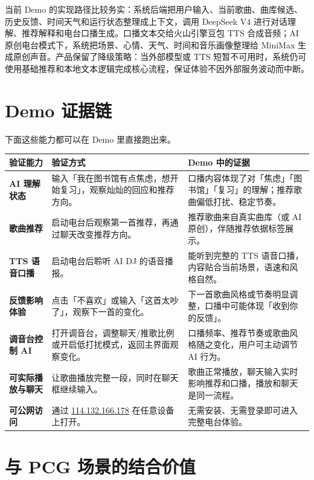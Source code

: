 \documentclass[UTF8,a4paper,11pt,fontset=windows]{ctexart}
\begin{document}
当前 Demo 的实现路径比较务实：系统后端把用户输入、当前歌曲、曲库候选、历史反馈、时间天气和运行状态整理成上下文，调用 DeepSeek V4 进行对话理解、推荐解释和电台口播生成。口播文本交给火山引擎豆包 TTS 合成音频；AI 原创电台模式下，系统把场景、心情、天气、时间和音乐画像整理给 MiniMax 生成原创声音。产品保留了降级策略：当外部模型或 TTS 短暂不可用时，系统仍可使用基础推荐和本地文本逻辑完成核心流程，保证体验不因外部服务波动而中断。

\section{Demo 证据链}

下面这些能力都可以在 Demo 里直接跑出来。

\begin{longtable}{>{\bfseries}p{2.8cm}p{5.2cm}p{6.6cm}}
\toprule
验证能力 & 验证方式 & Demo 中的证据 \\
\midrule
AI 理解状态 & 输入「我在图书馆有点焦虑，想开始复习」，观察灿灿的回应和推荐方向。 & 口播内容体现了对「焦虑」「图书馆」「复习」的理解；推荐歌曲偏低打扰、稳定节奏。 \\
歌曲推荐 & 启动电台后观察第一首推荐，再通过聊天改变推荐方向。 & 推荐歌曲来自真实曲库（或 AI 原创），伴随推荐依据标签展示。 \\
TTS 语音口播 & 启动电台后聆听 AI DJ 的语音播报。 & 能听到完整的 TTS 语音口播，内容贴合当前场景，语速和风格自然。 \\
反馈影响体验 & 点击「不喜欢」或输入「这首太吵了」，观察下一首的变化。 & 下一首歌曲风格或节奏明显调整，口播中可能体现「收到你的反馈」。 \\
调音台控制 AI & 打开调音台，调整聊天/推歌比例或开启低打扰模式，返回主界面观察变化。 & 口播频率、推荐节奏或歌曲风格随之变化，用户可主动调节 AI 行为。 \\
可实际播放与聊天 & 让歌曲播放完整一段，同时在聊天框继续输入。 & 歌曲正常播放，聊天输入实时影响推荐和口播，播放和聊天是同一流程。 \\
可公网访问 & 通过 \href{http://114.132.166.178}{114.132.166.178} 在任意设备上打开。 & 无需安装、无需登录即可进入完整电台体验。 \\
\bottomrule
\end{longtable}

\section{与 PCG 场景的结合价值}
\label{sec:pcg}
\end{document}
